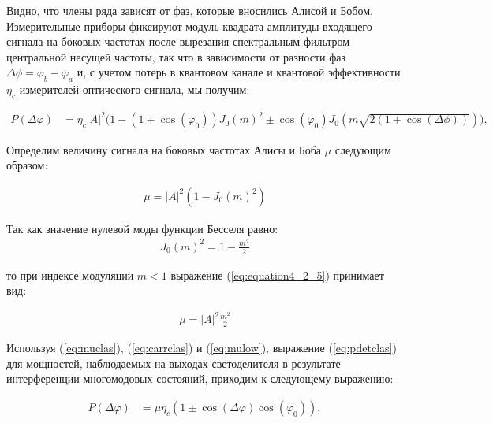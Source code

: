 Видно, что члены ряда зависят от фаз, которые вносились Алисой и Бобом. Измерительные приборы фиксируют модуль квадрата амплитуды входящего сигнала на боковых частотах после вырезания спектральным фильтром центральной несущей частоты, так что в зависимости от разности фаз $\Delta \phi = \varphi_b-\varphi_a$ и, с учетом потерь в квантовом канале и квантовой эффективности $\eta_c$ измерителей оптического сигнала, мы получим:

\begin{equation}
	\begin{aligned}
	\label{eq:pdetclas}
 		P(\Delta\varphi)&=\eta_c |A|^2 \Big(1-(1\mp\cos(\varphi_0)) J_{0}(m)^2 \pm \cos(\varphi_0) J_{0}(m\sqrt{2(1+\cos(\Delta\phi))}) \Big),
	\end{aligned}
\end{equation} 

Определим величину сигнала на боковых частотах Алисы и Боба $\mu$ следующим образом: 

\begin{equation}
	\begin{aligned}
	\label{eq:muclas}
		\mu = |A|^2 (1-J_{0}(m)^2)	
	\end{aligned}
\end{equation}

Так как значение нулевой моды функции Бесселя равно:
\begin{equation}
	\begin{aligned}
	\label{eq:carrclas}
		J_{0}(m)^2 = 1-\frac{m^2}{2} 	
	\end{aligned}
\end{equation}

то при индексе модуляции $m < 1$  выражение (\ref{eq:equation4_2_5}) принимает вид:

\begin{equation}
	\begin{aligned}
	\label{eq:mulow}
		\mu = |A|^2 \frac{m^2}{2}
	\end{aligned}
\end{equation}

Используя (\ref{eq:muclas}), (\ref{eq:carrclas}) и (\ref{eq:mulow}), выражение (\ref{eq:pdetclas}) для мощностей, наблюдаемых на выходах светоделителя в результате интерференции многомодовых состояний, приходим к следующему выражению: 

\begin{equation}
	\begin{aligned} 
	\label{eq:pinterf}
 		P(\Delta\varphi)&=\mu\eta_c(1\pm\cos(\Delta\varphi)\cos(\varphi_0)),
	\end{aligned}
\end{equation}

